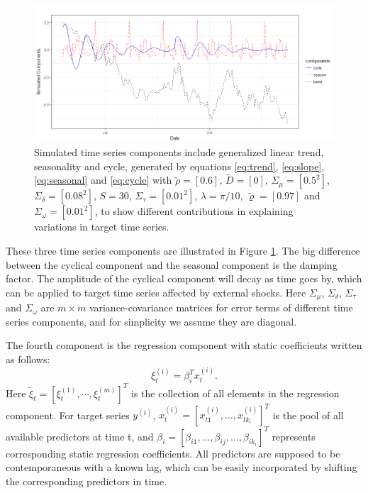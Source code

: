 \documentclass[twoside,11pt]{article}
\begin{document}
\begin{figure}[h]
	\centering
	\includegraphics[width=1\linewidth]{statecomp.png}
	\caption{Simulated time series components include generalized linear trend, seasonality and cycle, generated by equations \eqref{eq:trend}, \eqref{eq:slope}, \eqref{eq:seasonal} and \eqref{eq:cycle} with $\tilde{\rho}=[0.6]$, $\tilde{D}=[0]$, $ \Sigma_\mu=[0.5^2]$, $\Sigma_\delta=[0.08^2]$, $ S=30$, $ \Sigma_\tau=[0.01^2]$, $ \lambda=\pi/10$, $\tilde{\varrho}=[0.97]$ and $\Sigma_\omega=[0.01^2]$, to show different contributions in explaining variations in target time series.}
	\label{simulatedstate}
\end{figure}

These three time series components are illustrated in Figure \ref{simulatedstate}. The big difference between the cyclical component and the seasonal component is the damping factor. The amplitude of the cyclical component will decay as time goes by, which can be applied to target time series affected by external shocks. Here $\Sigma_\mu$, $\Sigma_\delta$, $\Sigma_\tau$ and $\Sigma_\omega$ are $m\times m$ variance-covariance matrices for error terms of different time series components, and for simplicity we assume they are diagonal.


The fourth component is the regression component with static coefficients written as follows:
\begin{equation} \label{eq:regression}
\xi^{(i)}_t=\beta_i^Tx^{(i)}_t.
\end{equation}
Here $\tilde{\xi}_t=[\xi_{t}^{(1)},\cdots,\xi_{t}^{(m)}]^T$ is the collection of all elements in the regression component.
For target series $y^{(i)}$,  $x_t^{(i)}=[x_{t1}^{(i)},\dots,x_{tk_i}^{(i)}]^T$ is the pool of all available predictors at time t, and $\beta_i=[\beta_{i1},\dots,\beta_{ij},\dots,\beta_{ik_i}]^T$ represents corresponding static regression coefficients. All predictors are supposed to be contemporaneous with a known lag, which can be easily incorporated by shifting the corresponding predictors in time.
\end{document}
